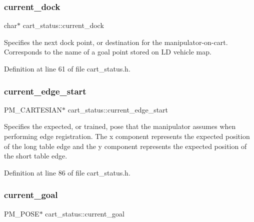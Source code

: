 \subsubsection{\texorpdfstring{current\+\_\+dock}{current\_dock}}
{\footnotesize\ttfamily char$\ast$ cart\+\_\+status\+::current\+\_\+dock\hspace{0.3cm}{\ttfamily [private]}}

Specifies the next dock point, or destination for the manipulator-\/on-\/cart. Corresponds to the name of a goal point stored on LD vehicle map. 

Definition at line 61 of file cart\+\_\+status.\+h.

\mbox{\label{classcart__status_aad004440fb11b544f0bd692ec6d2230a}} 
\subsubsection{\texorpdfstring{current\+\_\+edge\+\_\+start}{current\_edge\_start}}
{\footnotesize\ttfamily P\+M\+\_\+\+C\+A\+R\+T\+E\+S\+I\+AN$\ast$ cart\+\_\+status\+::current\+\_\+edge\+\_\+start\hspace{0.3cm}{\ttfamily [private]}}

Specifies the expected, or trained, pose that the manipulator assumes when performing edge registration. The x component represents the expected position of the long table edge and the y component represents the expected position of the short table edge. 

Definition at line 86 of file cart\+\_\+status.\+h.

\mbox{\label{classcart__status_aa6c952cba3af2fd3ad9c67567ecf419d}} 
\subsubsection{\texorpdfstring{current\+\_\+goal}{current\_goal}}
{\footnotesize\ttfamily P\+M\+\_\+\+P\+O\+SE$\ast$ cart\+\_\+status\+::current\+\_\+goal\hspace{0.3cm}{\ttfamily [private]}}

